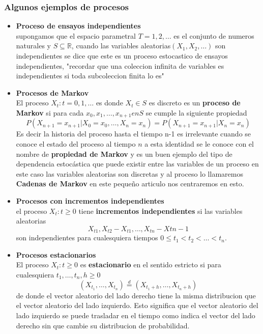 \documentclass{article}
\theoremstyle{definition}
\theoremstyle{remark}
\begin{document}
\subsubsection{Algunos ejemplos de procesos}
\begin{itemize}
	\item \textbf{Proceso de ensayos independientes}\\
	supongamos que el espacio parametral $T={1,2,\dots}$ es el conjunto de numeros naturales y $S \subseteq \mathbb{R}$, cuando las variables aleatorias$(X_{1},X_{2},\dots)$ son independientes se dice que este es un proceso estocastico de
	ensayos independientes, "recordar que una coleccion infinita de variables es independientes si toda subcoleccion finita lo es" \\
	\item \textbf{Procesos de Markov} \\
	El proceso ${X_{t}: t=0,1,\dots}$ es donde $X_{t} \in S$ es discreto es un \textbf{proceso de Markov} si para cada $x_0,x_1,\dots,x_{n+1} en S$ se cumple la siguiente propiedad 
	$$ P(X_{n+1}=x_{n+1}|X_0=x_0,\dots,X_n=x_n)=P(X_{n+1}=x_{n+1}|X_{n}=x_n) $$
	Es decir la historia del proceso hasta el tiempo n-1 es irrelevante cuando se conoce el estado del proceso al tiempo $n$ a esta identidad se le conoce con el nombre de \textbf{propiedad de Markov} y es un buen ejemplo del tipo de 
	dependencia estocástica que puede existir entre las variables de un proceso en este caso las variables aleatorias son discretas y al proceso lo llamaremos \textbf{Cadenas de Markov} en este pequeño articulo nos centraremos en esto. \\
	\item \textbf{Procesos con incrementos independientes} \\
	el proceso $ {X_{t}: t \geq 0}$ tiene \textbf{incrementos independientes} si las variables aleatorias $$X_{t1},X_{t2}-X_{t1},\dots, X_{tn}- X{tn-1}$$ son independientes para cualesquiera tiempos  $0\leq t_{1}<t_{2}<\dots<t_{n}.$\\
	\item \textbf{Procesos estacionarios}\\
	El proceso ${X_{t}:t\geq0}$ es \textbf{estacionario} en el sentido estricto si para cualesquiera $t_1,\dots,t_n,h \geq 0$
	$$(X_{t_1},\dots,X_{t_n})\stackrel{d}{=}(X_{t_1+h},\dots,X_{t_n+h})$$
	de donde el vector aleatorio del lado derecho tiene la misma distribucion que el vector aleatorio del lado izquierdo. Esto significa que el vector aleatorio del lado izquierdo se puede trasladar en el tiempo como indica el vector del lado derecho sin que cambie su distribucion de probabilidad.\\

\end{itemize}
\end{document}
